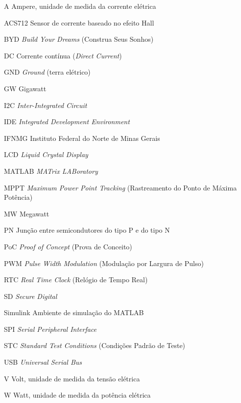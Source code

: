 
\begin{siglas}
  \item[A] Ampere, unidade de medida da corrente elétrica
\item[ACS712] Sensor de corrente baseado no efeito Hall
\item[BYD] \textit{Build Your Dreams} (Construa Seus Sonhos)
\item[DC] Corrente contínua (\textit{Direct Current})
\item[GND] \textit{Ground} (terra elétrico)
\item[GW] Gigawatt
\item[I2C] \textit{Inter-Integrated Circuit}
\item[IDE] \textit{Integrated Development Environment}
\item[IFNMG] Instituto Federal do Norte de Minas Gerais
\item[LCD] \textit{Liquid Crystal Display}
\item[MATLAB] \textit{MATrix LABoratory}
\item[MPPT] \textit{Maximum Power Point Tracking} (Rastreamento do Ponto de Máxima Potência)
\item[MW] Megawatt
\item[PN] Junção entre semicondutores do tipo P e do tipo N
\item[PoC] \textit{Proof of Concept} (Prova de Conceito)
\item[PWM] \textit{Pulse Width Modulation} (Modulação por Largura de Pulso)
\item[RTC] \textit{Real Time Clock} (Relógio de Tempo Real)
\item[SD] \textit{Secure Digital}
\item[Simulink] Ambiente de simulação do MATLAB
\item[SPI] \textit{Serial Peripheral Interface}
\item[STC] \textit{Standard Test Conditions} (Condições Padrão de Teste)
\item[USB] \textit{Universal Serial Bus}
\item[V] Volt, unidade de medida da tensão elétrica
\item[W] Watt, unidade de medida da potência elétrica

\end{siglas}